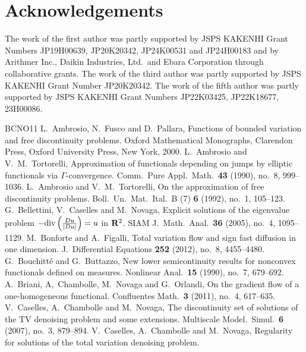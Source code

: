 \documentclass[11pt]{amsart} %
\numberwithin{equation}{section}
\begin{document}

\section*{Acknowledgements}
The work of the first author was partly supported by JSPS KAKENHI Grant Numbers JP19H00639, JP20K20342, JP24K00531 and JP24H00183 and by Arithmer Inc., Daikin Industries, Ltd.\ and Ebara Corporation through collaborative grants.
 The work of the third author was partly supported by JSPS KAKENHI Grant Number JP20K20342.
 The work of the fifth author was partly supported by JSPS KAKENHI Grant Numbers JP22K03425, JP22K18677, 23H00086.

\begin{thebibliography}{BCNO11}
%
L.\ Ambrosio, N.\ Fusco and D.\ Pallara, 
Functions of bounded variation and free discontinuity problems. 
Oxford Mathematical Monographs, Clarendon Press, 
Oxford University Press, New York, 2000.
%
L.\ Ambrosio and V.\ M.\ Tortorelli, 
Approximation of functionals depending on jumps by elliptic functionals via $\Gamma$-convergence. 
Comm.\ Pure Appl.\ Math.\ {\bf43} (1990), no.\ 8, 999--1036.
%
L.\ Ambrosio and V.\ M.\ Tortorelli, 
On the approximation of free discontinuity problems. 
Boll.\ Un.\ Mat.\ Ital.\ B (7) {\bf6} (1992), no.\ 1, 105--123.
%
G.\ Bellettini, V.\ Caselles and M.\ Novaga, 
Explicit solutions of the eigenvalue problem $-{\rm div}\left(\frac{Du}{|Du|}\right)=u$ in $\bold R^2$. 
SIAM J.\ Math.\ Anal.\ {\bf36} (2005), no.\ 4, 1095--1129.
%
M.\ Bonforte and A.\ Figalli, 
Total variation flow and sign fast diffusion in one dimension. 
J.\ Differential Equations {\bf252} (2012), no.\ 8, 4455--4480.
%
G.\ Bouchitt\'e and G.\ Buttazzo, 
New lower semicontinuity results for nonconvex functionals defined on measures. 
Nonlinear Anal.\ {\bf15} (1990), no.\ 7, 679--692.
%
A.\ Briani, A,\ Chambolle, M.\ Novaga and G.\ Orlandi, 
On the gradient flow of a one-homogeneous functional. 
Confluentes Math.\ {\bf3} (2011), no.\ 4, 617--635.
%
V.\ Caselles, A.\ Chambolle and M.\ Novaga, 
The discontinuity set of solutions of the TV denoising problem and some extensions. 
Multiscale Model.\ Simul.\ {\bf6} (2007), no.\ 3, 879--894.
%
V.\ Caselles, A.\ Chambolle and M.\ Novaga, 
Regularity for solutions of the total variation denoising problem. 

\end{thebibliography}
\end{document}

